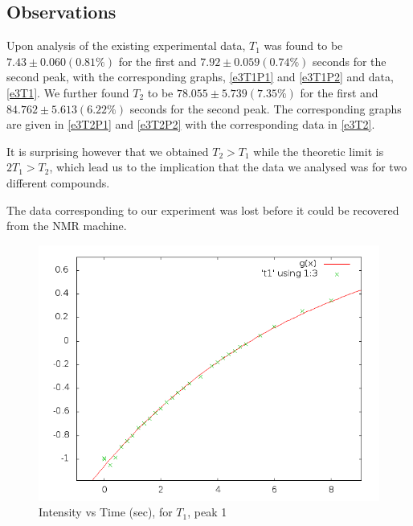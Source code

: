 	\subsection{Observations}
		Upon analysis of the existing experimental data, $T_1$ was found to be $7.43 \pm 0.060 (0.81\%)$ for the first and $7.92 \pm 0.059 (0.74\%)$ seconds for the second peak, with the corresponding graphs, \autoref{e3T1P1} and \autoref{e3T1P2} and data, \autoref{e3T1}. We further found $T_2$ to be $78.055 \pm 5.739 (7.35\%)$ for the first and $84.762 \pm 5.613 (6.22\%)$ seconds for the second peak. The corresponding graphs are given in \autoref{e3T2P1} and \autoref{e3T2P2} with the corresponding data in \autoref{e3T2}. 
		\par
		It is surprising however that we obtained $T_2>T_1$ while the theoretic limit is $2T_1>T_2$, which lead us to the implication that the data we analysed was for two different compounds.
		\par
		The data corresponding to our experiment was lost before it could be recovered from the NMR machine.

		\label{e3T1}
		\label{e3T2}

		\begin{figure}[bth]
			\begin{center}
				\includegraphics[width=1.1\linewidth]{gfx/e3_T1P1}
			\end{center}
		\caption[$T_1$, peak 1]{Intensity vs Time (sec), for $T_1$, peak 1}
		\label{e3T1P1}
		\end{figure}

